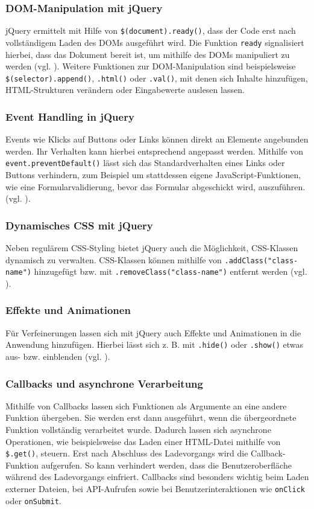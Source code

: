 \documentclass[oneside]{ausarbeitung}
\begin{document}
\subsubsection{DOM-Manipulation mit jQuery}
jQuery ermittelt mit Hilfe von \texttt{\$(document).ready()}, dass der Code erst nach vollständigem Laden des DOMs ausgeführt wird. Die Funktion \texttt{ready} signalisiert hierbei, dass das Dokument bereit ist, um mithilfe des DOMs manipuliert zu werden (vgl. \parencite{jquery_api}).  
Weitere Funktionen zur DOM-Manipulation sind beispielsweise \texttt{\$(selector).append()}, \texttt{.html()} oder \texttt{.val()}, mit denen sich Inhalte hinzufügen, \ac{HTML}-Strukturen verändern oder Eingabewerte auslesen lassen.

\subsubsection{Event Handling in jQuery}
Events wie Klicks auf Buttons oder Links können direkt an Elemente angebunden werden. Ihr Verhalten kann hierbei entsprechend angepasst werden. Mithilfe von \texttt{event.preventDefault()} lässt sich das Standardverhalten eines Links oder Buttons verhindern, zum Beispiel um stattdessen eigene JavaScript-Funktionen, wie eine Formularvalidierung, bevor das Formular abgeschickt wird, auszuführen. (vgl. \parencite{jquery_api}).

\subsubsection{Dynamisches CSS mit jQuery}

Neben regulärem \ac{CSS}-Styling bietet jQuery auch die Möglichkeit, \ac{CSS}-Klassen dynamisch zu verwalten.  
\ac{CSS}-Klassen können mithilfe von \texttt{.addClass("class-name")} hinzugefügt bzw. mit \texttt{.removeClass("class-name")} entfernt werden (vgl. \parencite{jquery_api}).


\subsubsection{Effekte und Animationen}
Für Verfeinerungen lassen sich mit jQuery auch Effekte und Animationen in die Anwendung hinzufügen. Hierbei lässt sich z. B. mit \texttt{.hide()} oder \texttt{.show()} etwas aus- bzw. einblenden (vgl. \parencite{jquery_api}).  

\subsubsection{Callbacks und asynchrone Verarbeitung}
Mithilfe von Callbacks lassen sich Funktionen als Argumente an eine andere Funktion übergeben. Sie werden erst dann ausgeführt, wenn die übergeordnete Funktion vollständig verarbeitet wurde. Dadurch lassen sich asynchrone Operationen, wie beispielsweise das Laden einer \ac{HTML}-Datei mithilfe von \texttt{\$.get()}, steuern. Erst nach Abschluss des Ladevorgangs wird die Callback-Funktion aufgerufen. So kann verhindert werden, dass die Benutzeroberfläche während des Ladevorgangs einfriert. Callbacks sind besonders wichtig beim Laden externer Dateien, bei API-Aufrufen sowie bei Benutzerinteraktionen wie \texttt{onClick} oder \texttt{onSubmit}.
\end{document}
